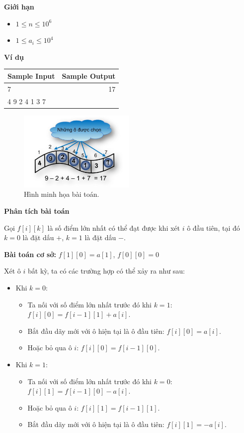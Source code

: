\documentclass{article}
\begin{document}
\textbf{Giới hạn}
\begin{itemize}
    \item $1 \leq n \leq 10^6$
    \item $1 \leq a_i \leq 10^4$
\end{itemize}

\textbf{Ví dụ}

\begin{table}[h]
    \centering
    \begin{tabular}{|l|r|}
        \hline
        \textbf{Sample Input} & \textbf{Sample Output} \\
        \hline
		7 & 17 \\ 
		4 9 2 4 1 3 7&  \\ 
		\hline
    \end{tabular}
\end{table}

\begin{figure}[h]
    \centering
    \includegraphics[width=0.5\textwidth]{img/linegame.png}
    \caption{Hình minh họa bài toán.}
\end{figure}

\textbf{Phân tích bài toán}

Gọi $f[i][k]$ là số điểm lớn nhất có thể đạt được khi xét $i$ ô đầu tiên, tại đó $k = 0$ là đặt dấu $+$, $k = 1$ là đặt dấu $-$.

\textbf{Bài toán cơ sở:} $f[1][0] = a[1]$, $f[0][0] = 0$

Xét ô $i$ bất kỳ, ta có các trường hợp có thể xảy ra như sau:

\begin{itemize}
    \item Khi $k = 0$:
    \begin{itemize}
        \item Ta nối với số điểm lớn nhất trước đó khi $k = 1$: $f[i][0] = f[i - 1][1] + a[i]$.
        \item Bắt đầu dãy mới với ô hiện tại là ô đầu tiên: $f[i][0] = a[i]$.
        \item Hoặc bỏ qua ô $i$: $f[i][0] = f[i - 1][0]$.
    \end{itemize}
    \item Khi $k = 1$:
    \begin{itemize}
        \item Ta nối với số điểm lớn nhất trước đó khi $k = 0$: $f[i][1] = f[i - 1][0] - a[i]$.
        \item Hoặc bỏ qua ô $i$: $f[i][1] = f[i - 1][1]$.
        \item Bắt đầu dãy mới với ô hiện tại là ô đầu tiên: $f[i][1] = -a[i]$.
    \end{itemize}
\end{itemize}
\end{document}
